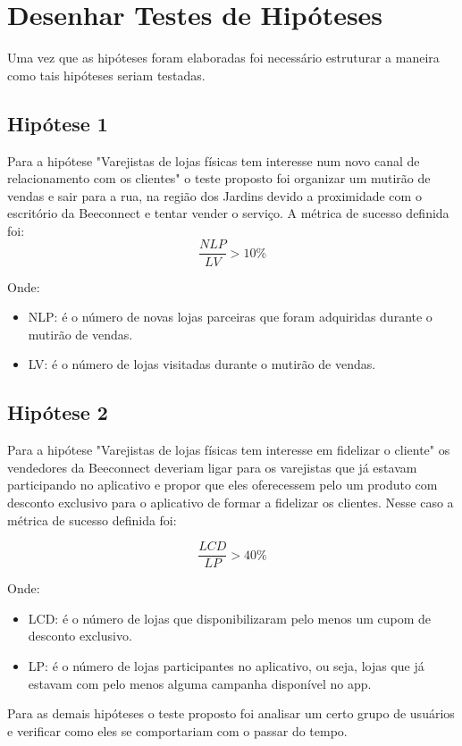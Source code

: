 \section{Desenhar Testes de Hipóteses}
\label{cha:desenhar_hipoteses}
Uma vez que as hipóteses foram elaboradas foi necessário estruturar a maneira como tais hipóteses seriam testadas. 

\subsection{Hipótese 1}
\label{cha:hip_1}
Para a hipótese "Varejistas de lojas físicas tem interesse num novo canal de relacionamento com os clientes" o teste proposto foi organizar um mutirão de vendas e sair para a rua, na região dos Jardins devido a proximidade com o escritório da Beeconnect e tentar vender o serviço. A métrica de sucesso definida foi:
\[ \dfrac{NLP}{LV} > 10\%\]

Onde: 
\begin{itemize}
\item NLP: é o número de novas lojas parceiras que foram adquiridas durante o mutirão de vendas.
\item LV: é o número de lojas visitadas durante o mutirão de vendas.
\end{itemize}

\subsection{Hipótese 2}
\label{cha:hip_2}
Para a hipótese "Varejistas de lojas físicas tem interesse em fidelizar o cliente" os vendedores da Beeconnect deveriam ligar para os varejistas que já estavam participando no aplicativo e propor que eles oferecessem pelo um produto com desconto exclusivo para o aplicativo de formar a fidelizar os clientes. Nesse caso a métrica de sucesso definida foi:

\[\dfrac{LCD}{LP} > 40\%\]

Onde: 
\begin{itemize}
\item LCD: é o número de lojas que disponibilizaram pelo menos um cupom de desconto exclusivo.
\item LP: é o número de lojas participantes no aplicativo, ou seja, lojas que já estavam com pelo menos alguma campanha disponível no app.
\end{itemize}

Para as demais hipóteses o teste proposto foi analisar um certo grupo de usuários e verificar como eles se comportariam com o passar do tempo. 

